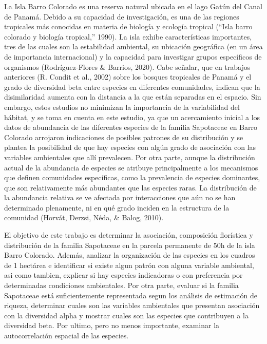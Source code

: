 \documentclass[11pt,]{article}
\begin{document}
La Isla Barro Colorado es una reserva natural ubicada en el lago Gatún
del Canal de Panamá. Debido a su capacidad de investigación, es una de
las regiones tropicales más conocidas en materia de biología y ecología
tropical (``Isla barro colorado y biología tropical,'' 1990). La isla
exhibe características importantes, tres de las cuales son la
estabilidad ambiental, su ubicación geográfica (en un área de
importancia internacional) y la capacidad para investigar grupos
específicos de organismos (Rodríguez-Flores \& Barrios, 2020). Cabe
señalar, que en trabajos anteriores (R. Condit et al., 2002) sobre los
bosques tropicales de Panamá y el grado de diversidad beta entre
especies en diferentes comunidades, indican que la disimilaridad aumenta
con la distancia a la que están separadas en el espacio. Sin embargo,
estos estudios no minimizan la importancia de la variabilidad del
hábitat, y se toma en cuenta en este estudio, ya que un acercamiento
inicial a los datos de abundancia de las diferentes especies de la
familia Sapotaceae en Barro Colorado arrojaron indicaciones de posibles
patrones de su distribución y se plantea la posibilidad de que hay
especies con algún grado de asociación con las variables ambientales que
allí prevalecen. Por otra parte, aunque la distribución actual de la
abundancia de especies se atribuye principalmente a los mecanismos que
definen comunidades específicas, como la prevalencia de especies
dominantes, que son relativamente más abundantes que las especies raras.
La distribución de la abundancia relativa se ve afectada por
interacciones que aún no se han determinado plenamente, ni en qué grado
inciden en la estructura de la comunidad (Horvát, Derzsi, Néda, \&
Balog, 2010).

El objetivo de este trabajo es determinar la asociación, composición
florística y distribución de la familia Sapotaceae en la parcela
permanente de 50h de la isla Barro Colorado. Además, analizar la
organización de las especies en los cuadros de 1 hectárea e identificar
si existe algun patrón con alguna variable ambiental, asi como tambien,
explicar si hay especies indicadoras o con preferencia por determinadas
condiciones ambientales. Por otra parte, evaluar si la familia
Sapotaceae está suficientemente representada segun los análisis de
estimación de riqueza, determinar cuales son las variables ambientales
que presentan asociación con la diversidad alpha y mostrar cuales son
las especies que contribuyen a la diversidad beta. Por ultimo, pero no
menos importante, examinar la autocorrelación espacial de las especies.
\end{document}
